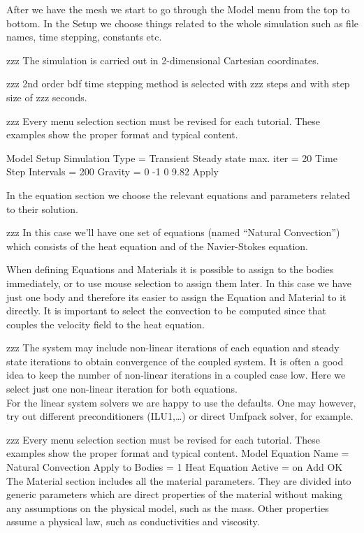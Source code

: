 After we have the mesh we start to go through the Model menu from the top to bottom.  In the Setup we choose things related to the whole simulation such as file names, time stepping, constants etc.  

zzz The simulation is carried out in 2-dimensional Cartesian coordinates.

zzz 2nd order bdf time stepping method is selected with zzz steps and with step size of zzz seconds.

zzz Every menu selection section must be revised for each tutorial.  These examples show the proper format and typical content.

\ttbegin
Model
  Setup 
    Simulation Type = Transient
    Steady state max. iter = 20
    Time Step Intervals = 200
    Gravity = 0 -1 0 9.82
  Apply
\ttend

In the equation section we choose the relevant equations and parameters related to their solution. 

zzz In this case we'll have one set of equations (named ``Natural Convection'') which consists of the heat equation and of the Navier-Stokes equation.

When defining Equations and Materials it is possible to assign to the bodies immediately, or to use mouse selection to assign them later. In this case we have just one body and therefore its easier to assign the Equation and Material to it directly.  It is important to select the convection to be computed since that couples the velocity field to the heat equation.

zzz The system may include non-linear iterations of each equation and steady state iterations to obtain convergence of the coupled system. It is often a good idea to keep the number of non-linear iterations in a coupled case low. Here we select just one non-linear iteration for both equations.\\

For the linear system solvers we are happy to use the defaults. One may however, try out different preconditioners (ILU1,\ldots) or direct Umfpack solver, for example.

zzz Every menu selection section must be revised for each tutorial.  These examples show the proper format and typical content.
\ttbegin
Model
  Equation
   Name = Natural Convection
    Apply to Bodies = 1
    Heat Equation
      Active = on
    Add 
    OK
\ttend        
The Material section includes all the material parameters. They are divided into generic parameters which are direct properties of the material without making any assumptions on the physical model, such as the mass. Other properties assume a physical law, such as conductivities and viscosity. 

